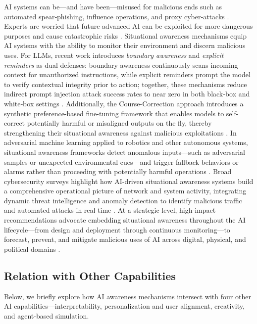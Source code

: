 AI systems can be—and have been—misused for malicious ends such as automated spear‑phishing, influence operations, and proxy cyber‑attacks \citep{brundage2018malicious}. Experts are worried that future advanced AI can be exploited for more dangerous purposes and cause catastrophic risks \citep{hendrycks2023overview, xu2025nuclear}.
Situational awareness mechanisms equip AI systems with the ability to monitor their environment and discern malicious uses. 
For LLMs, recent work introduces \emph{boundary awareness} and \emph{explicit reminders} as dual defenses: boundary awareness continuously scans incoming context for unauthorized instructions, while explicit reminders prompt the model to verify contextual integrity prior to action; together, these mechanisms reduce indirect prompt injection attack success rates to near zero in both black‑box and white‑box settings \citep{yi2023benchmarking}.
Additionally, the Course-Correction approach introduces a synthetic preference-based fine-tuning framework that enables models to self-correct potentially harmful or misaligned outputs on the fly, thereby strengthening their situational awareness against malicious exploitations \citep{xu2024course}.
In adversarial machine learning applied to robotics and other autonomous systems, situational awareness frameworks detect anomalous inputs—such as adversarial samples or unexpected environmental cues—and trigger fallback behaviors or alarms rather than proceeding with potentially harmful operations \citep{anderson2021situational}. 
Broad cybersecurity surveys highlight how AI‑driven situational awareness systems build a comprehensive operational picture of network and system activity, integrating dynamic threat intelligence and anomaly detection to identify malicious traffic and automated attacks in real time \citep{kaur2023artificial}.
At a strategic level, high‑impact recommendations advocate embedding situational awareness throughout the AI lifecycle—from design and deployment through continuous monitoring—to forecast, prevent, and mitigate malicious uses of AI across digital, physical, and political domains \citep{brundage2018malicious}.




\subsection{Relation with Other Capabilities}

Below, we briefly explore how AI awareness mechanisms intersect with four other AI capabilities—interpretability, personalization and user alignment, creativity, and agent-based simulation. 

